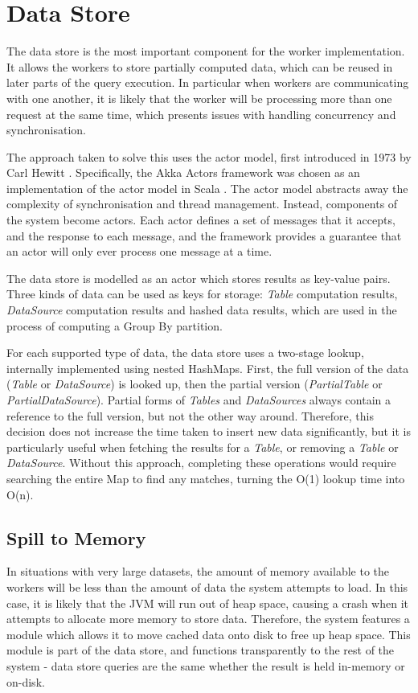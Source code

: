 \section{Data Store}
The data store is the most important component for the worker implementation. It allows the workers to store partially computed data, which can be reused in later parts of the query execution. In particular when workers are communicating with one another, it is likely that the worker will be processing more than one request at the same time, which presents issues with handling concurrency and synchronisation.

The approach taken to solve this uses the actor model, first introduced in 1973 by Carl Hewitt \cite{hewitt1973session}. Specifically, the Akka Actors framework was chosen as an implementation of the actor model in Scala \cite{akkaactors}. The actor model abstracts away the complexity of synchronisation and thread management. Instead, components of the system become actors. Each actor defines a set of messages that it accepts, and the response to each message, and the framework provides a guarantee that an actor will only ever process one message at a time.

The data store is modelled as an actor which stores results as key-value pairs. Three kinds of data can be used as keys for storage: \textit{Table} computation results, \textit{DataSource} computation results and hashed data results, which are used in the process of computing a Group By partition. 

For each supported type of data, the data store uses a two-stage lookup, internally implemented using nested HashMaps. First, the full version of the data (\textit{Table} or \textit{DataSource}) is looked up, then the partial version (\textit{PartialTable} or \textit{PartialDataSource}). Partial forms of \textit{Tables} and \textit{DataSources} always contain a reference to the full version, but not the other way around. Therefore, this decision does not increase the time taken to insert new data significantly, but it is particularly useful when fetching the results for a \textit{Table}, or removing a \textit{Table} or \textit{DataSource}. Without this approach, completing these operations would require searching the entire Map to find any matches, turning the O(1) lookup time into O(n).

\subsection{Spill to Memory}
In situations with very large datasets, the amount of memory available to the workers will be less than the amount of data the system attempts to load. In this case, it is likely that the JVM will run out of heap space, causing a crash when it attempts to allocate more memory to store data. Therefore, the system features a module which allows it to move cached data onto disk to free up heap space. This module is part of the data store, and functions transparently to the rest of the system - data store queries are the same whether the result is held in-memory or on-disk.


